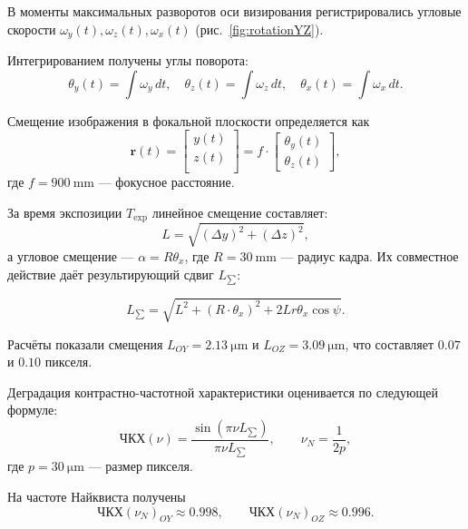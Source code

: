 В моменты максимальных разворотов оси визирования регистрировались угловые скорости
$\omega_y(t), \omega_z(t), \omega_x(t)$ (рис.~\cref{fig:rotationYZ}).

Интегрированием получены углы поворота:
\begin{equation*}
	\theta_y(t)=\int \omega_y\,dt,\quad
	\theta_z(t)=\int \omega_z\,dt,\quad
	\theta_x(t)=\int \omega_x\,dt.
\end{equation*}
\begin{samepage}
Смещение изображения в фокальной плоскости определяется как
\begin{equation*}
	\label{eq:bias}
	\mathbf{r}(t) = 
	\begin{bmatrix}
		y(t) \\
		z(t) \\
	\end{bmatrix}
	= f \cdot
	\begin{bmatrix}
		\theta_{y}(t) \\
		\theta_{z}(t)
	\end{bmatrix},
\end{equation*}
где $f=\SI{900}{\milli\meter}$ — фокусное расстояние.

\end{samepage}

За время экспозиции $T_{\mathrm{exp}}$ линейное смещение составляет:
 \begin{equation*}
	\label{eq:biasL}
	L=\sqrt{(\Delta y)^2+(\Delta z)^2},
\end{equation*}
а угловое смещение — $\alpha=R\theta_x$, где $R=\SI{30}{\milli\meter}$ — радиус кадра.
Их совместное действие даёт результирующий сдвиг $L_{\sum}$:

 \begin{equation*}
	\label{eq:L_total}
	L_{\sum} = \sqrt{L^2 + (R\cdot \theta_x)^2 + 2Lr\theta_x\cos{\psi}}.
\end{equation*}

Расчёты показали смещения
$L_{OY}=\SI{2.13}{\micro\meter}$ и
$L_{OZ}=\SI{3.09}{\micro\meter}$,
что составляет $0.07$ и $0.10$ пикселя.

Деградация контрастно-частотной характеристики оценивается по следующей формуле:
\begin{equation*}
	\text{ЧКХ}(\nu)=\frac{\sin(\pi\nu L_{\mathrm{\sum}})}{\pi\nu L_{\mathrm{\sum}}},\qquad
	\nu_N=\frac{1}{2p},
\end{equation*}
где $p=\SI{30}{\micro\meter}$ — размер пикселя.

 На частоте Найквиста получены
\[
ЧКХ(\nu_N)_{OY}\approx 0.998,\qquad
ЧКХ(\nu_N)_{OZ}\approx 0.996.
\]

